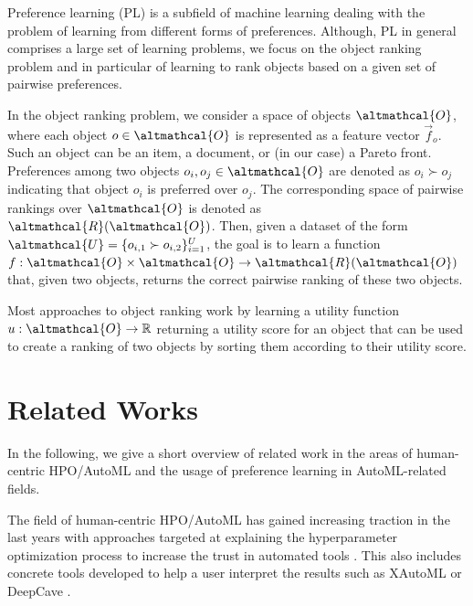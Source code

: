 Preference learning (PL) \cite{furnkranz-plbook10a} is a subfield of machine learning dealing with the problem of learning from different forms of preferences. Although, PL in general comprises a large set of learning problems, we  focus on the object ranking problem \cite{furnkranz-plbook10a} and in particular of learning to rank objects based on a given set of pairwise preferences. 

In the object ranking problem, we consider a space of objects $\altmathcal{O}$, where each object $o \in \altmathcal{O}$ is represented as a feature vector $\vec{f}_o$. Such an object can be an item, a document, or (in our case) a Pareto front. Preferences among two objects $o_i, o_j \in \altmathcal{O}$ are denoted as $o_i \succ o_j$ indicating that object $o_i$ is preferred over $o_j$. The corresponding space of pairwise rankings over $\altmathcal{O}$ is denoted as $\altmathcal{R}(\altmathcal{O})$. Then, given a dataset of the form $\altmathcal{U} = \{o_{i,1} \succ o_{i,2}\}_{i=1}^U$, the goal is to learn a function $f: \altmathcal{O} \times \altmathcal{O} \rightarrow \altmathcal{R}(\altmathcal{O})$ that, given two objects, returns the correct pairwise ranking of these two objects. 

Most approaches to object ranking work by learning a utility function $u: \altmathcal{O} \rightarrow \mathbb{R}$ returning a utility score for an object that can be used to create a ranking of two objects by sorting them according to their utility score. 

\section{Related Works}\label{moo-sec:background_work}
In the following, we give a short overview of related work in the areas of human-centric HPO/AutoML and the usage of preference learning in AutoML-related fields.

The field of human-centric HPO/AutoML has gained increasing traction in the last years with approaches targeted at explaining the hyperparameter optimization process to increase the trust in automated tools \cite{pfisterer-arxiv2019a,moosbauer-neurips21a,moosbauer-arxiv22a,segel-automl23a}. This also includes concrete tools developed to help a user interpret the results such as XAutoML \cite{zoller-arxiv22a} or DeepCave \cite{sass-realml22a}. 

